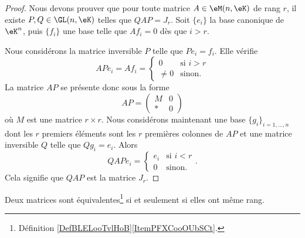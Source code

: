 \begin{proof}
    Nous devons prouver que pour toute matrice \( A\in\eM(n,\eK)\) de rang \( r\), il existe \( P,Q\in\GL(n,\eK)\) telles que \(QAP=J_r\). Soit \( \{ e_i \}\) la base canonique de \( \eK^n\), puis \( \{ f_i \}\) une base telle que \( Af_i=0\) dès que \( i>r\).

    Nous considérons la matrice inversible \( P\) telle que \( Pe_i=f_i\). Elle vérifie
    \begin{equation}
        APe_i=Af_i=\begin{cases}
            0    &   \text{si } i>r\\
            \neq 0    &    \text{sinon}.
        \end{cases}
    \end{equation}
    La matrice \( AP\) se présente donc sous la forme
    \begin{equation}
        AP=\begin{pmatrix}
            M    &   0    \\ 
            *    &   0    
        \end{pmatrix}
    \end{equation}
    où \( M\) est une matrice \( r\times r\). Nous considérons maintenant une base \( \{ g_i \}_{i=1,\ldots, n}\) dont les \( r\) premiers éléments sont les \( r\) premières colonnes de \( AP\) et une matrice inversible \( Q\) telle que \( Qg_i=e_i\). Alors
    \begin{equation}
        QAPe_i=\begin{cases}
            e_i    &   \text{si } i<r\\
            0    &    \text{sinon}.
        \end{cases}.
    \end{equation}
    Cela signifie que \( QAP\) est la matrice \( J_r\).
\end{proof}

\begin{corollary}      \label{CorGOUYooErfOIe}
    Deux matrices sont équivalentes\footnote{Définition \ref{DefBLELooTvlHoB}\ref{ItemPFXCooOUbSCt}.} si et seulement si elles ont même rang.
\end{corollary}

